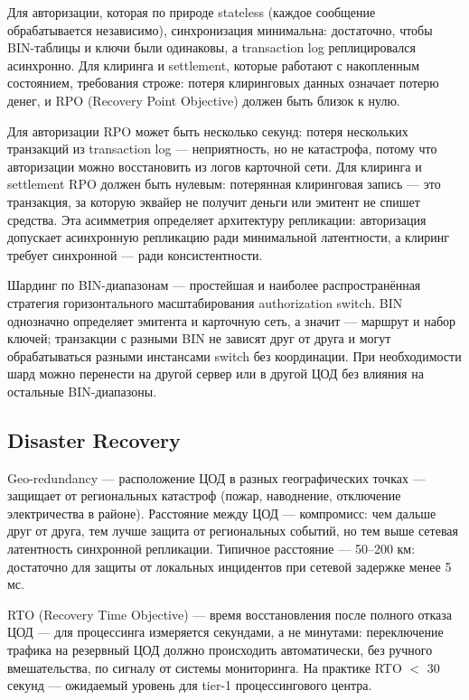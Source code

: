 Для авторизации, которая по природе stateless (каждое сообщение
обрабатывается независимо), синхронизация минимальна:
достаточно, чтобы BIN-таблицы и ключи были одинаковы, а transaction
log реплицировался асинхронно. Для клиринга и settlement,
которые работают с накопленным состоянием, требования строже:
потеря клиринговых данных означает потерю денег, и RPO
(Recovery Point Objective) должен быть близок к нулю.

\begin{kaobox}[title=Важно, colback=red!5, colbacktitle=red!20]
  Для авторизации RPO может быть несколько секунд: потеря
  нескольких транзакций из transaction log — неприятность,
  но не катастрофа, потому что авторизации можно восстановить
  из логов карточной сети. Для клиринга и settlement RPO
  должен быть нулевым: потерянная клиринговая запись —
  это транзакция, за которую эквайер не получит деньги
  или эмитент не спишет средства. Эта асимметрия определяет
  архитектуру репликации: авторизация допускает асинхронную
  репликацию ради минимальной латентности, а клиринг требует
  синхронной — ради консистентности.
\end{kaobox}

\begin{kaobox}[title=На практике]
  Шардинг по BIN-диапазонам — простейшая и наиболее
  распространённая стратегия горизонтального масштабирования
  authorization switch. BIN однозначно определяет эмитента
  и карточную сеть, а значит — маршрут и набор ключей;
  транзакции с разными BIN не зависят друг от друга
  и могут обрабатываться разными инстансами switch
  без координации. При необходимости шард можно перенести
  на другой сервер или в другой ЦОД без влияния на остальные
  BIN-диапазоны.
\end{kaobox}

\subsection*{Disaster Recovery}

Geo-redundancy — расположение ЦОД в разных географических точках — защищает от региональных катастроф (пожар,
наводнение, отключение электричества в районе). Расстояние между ЦОД — компромисс: чем дальше друг от друга, тем лучше
защита от региональных событий, но тем выше сетевая латентность синхронной репликации. Типичное расстояние — 50--200
км: достаточно для защиты от локальных инцидентов при сетевой задержке менее 5 мс.

RTO (Recovery Time Objective) — время восстановления после полного отказа ЦОД — для процессинга измеряется секундами, а
не минутами: переключение трафика на резервный ЦОД должно происходить автоматически, без ручного вмешательства, по
сигналу от системы мониторинга. На практике RTO $<$ 30 секунд — ожидаемый уровень для tier-1 процессингового центра.

